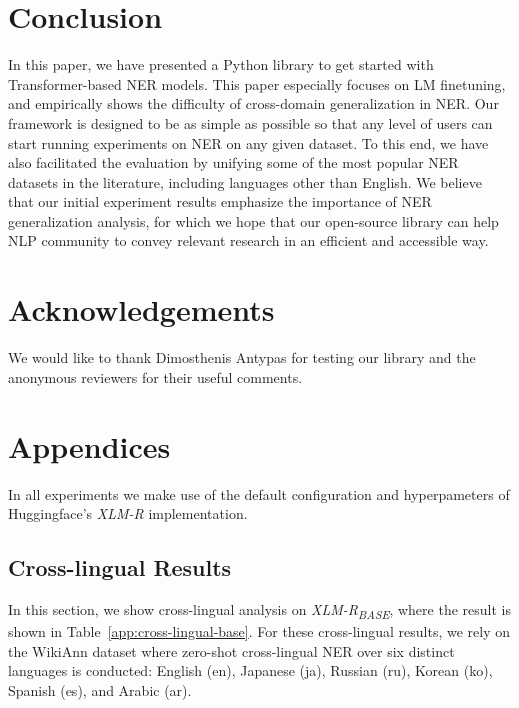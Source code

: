 \documentclass[11pt,a4paper]{article}
\begin{document}
\section{Conclusion}
In this paper, we have presented a Python library to get started with Transformer-based NER models. This paper especially focuses on LM finetuning, and empirically shows the difficulty of cross-domain generalization in NER. 
Our framework is designed to be as simple as possible so that any level of users can start running experiments on NER on any given dataset. To this end, we have also facilitated the evaluation by unifying some of the most popular NER datasets in the literature, including languages other than English. We believe that our initial experiment results emphasize the importance of NER generalization analysis, for which we hope that our open-source library can help NLP community to convey relevant research in an efficient and accessible way.


\section*{Acknowledgements}
We would like to thank Dimosthenis Antypas for testing our library and the anonymous reviewers for their useful comments.






\appendix

\section{Appendices}
\label{sec:appendix}

In all experiments we make use of the default configuration and hyperpameters of Huggingface's {\it XLM-R} implementation.


\subsection{Cross-lingual Results}
In this section, we show cross-lingual analysis on {\it XLM-R\textsubscript{BASE}}, where the result is shown in Table~\ref{app:cross-lingual-base}. For these cross-lingual results, we rely on the WikiAnn dataset where zero-shot cross-lingual NER over six distinct languages is conducted: English (en), Japanese (ja), Russian (ru), Korean (ko), Spanish (es), and Arabic (ar). 
\end{document}
